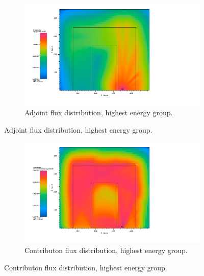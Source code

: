 \begin{figure}[htb!]
  \centering
  \begin{subfigure}[t]{\textwidth}
    \includegraphics[width=0.9\linewidth]{./chapters/characterization_probs/figures/char/prob_2/prob2adjG00.png}
    \caption{Adjoint flux distribution, highest energy group.}
    \label{fig:ubendadjflux}
  \end{subfigure}
\end{figure}
\begin{figure}[htb!]\ContinuedFloat
  \centering
  \begin{subfigure}[t]{\textwidth}
    \includegraphics[width=0.9\linewidth]{./chapters/characterization_probs/figures/char/prob_2/prob2contribG00.png}
    \caption{Contributon flux distribution, highest energy group.}
    \label{fig:ubendcontribflux}
  \end{subfigure}
\end{figure}
